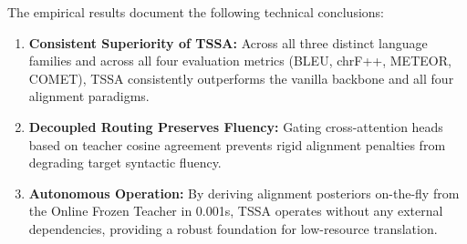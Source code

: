 \documentclass[11pt,a4paper]{article}
\begin{document}
The empirical results document the following technical conclusions:
\begin{enumerate}[leftmargin=*]
    \item \textbf{Consistent Superiority of TSSA:} Across all three distinct language families and across all four evaluation metrics (BLEU, chrF++, METEOR, COMET), TSSA consistently outperforms the vanilla backbone and all four alignment paradigms.
    \item \textbf{Decoupled Routing Preserves Fluency:} Gating cross-attention heads based on teacher cosine agreement prevents rigid alignment penalties from degrading target syntactic fluency.
    \item \textbf{Autonomous Operation:} By deriving alignment posteriors on-the-fly from the Online Frozen Teacher in 0.001s, TSSA operates without any external dependencies, providing a robust foundation for low-resource translation.
\end{enumerate}
\end{document}
